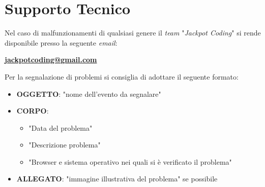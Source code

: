 \documentclass[5pt]{article}
\begin{document}
	\section{Supporto Tecnico}
		Nel caso di malfunzionamenti di qualsiasi genere il \textit{team} "\textit{Jackpot Coding}" si rende disponibile presso la seguente \textit{email}:
		\begin{center}
			\textbf{\url{jackpotcoding@gmail.com}}
		\end{center}

		Per la segnalazione di problemi si consiglia di adottare il seguente formato:
		\begin{itemize}
			\item \textbf{OGGETTO}: "nome dell'evento da segnalare"
			\item \textbf{CORPO}:
			\begin{itemize}
				\item "Data del problema"
				\item "Descrizione problema"
				\item "Browser e sistema operativo nei quali si è verificato il problema"
			\end{itemize}
			\item \textbf{ALLEGATO}: "immagine illustrativa del problema" se possibile
		\end{itemize}
        
\end{document}
